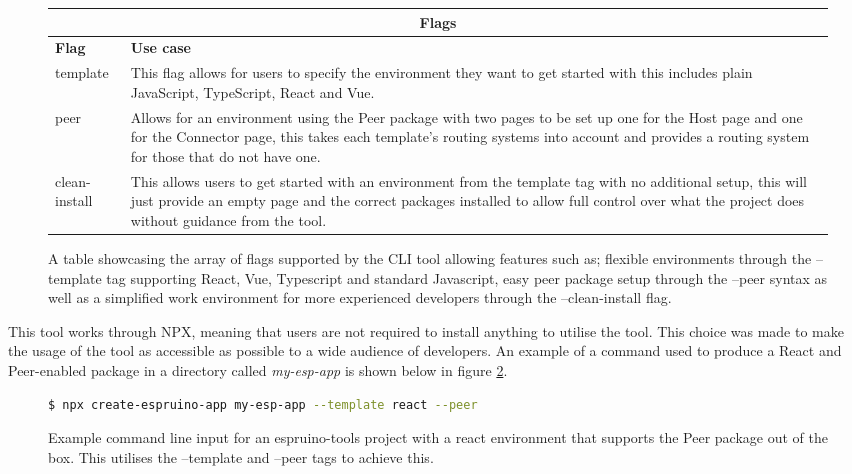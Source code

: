 \documentclass{l4proj}
\begin{document}
\begin{figure}[!ht]
    \centering
    \begin{tabular}{|p{2.25cm}|p{10cm}|}
 \hline
 \multicolumn{2}{|c|}{Flags} \\
 \hline
 \textbf{Flag}  & \textbf{Use case}\\
 \hline
 template & This flag allows for users to specify the environment they want to get started with this includes plain JavaScript, TypeScript, React and Vue.\\ \hline

 peer & Allows for an environment using the Peer package with two pages to be set up one for the Host page and one for the Connector page, this takes each template's routing systems into account and provides a routing system for those that do not have one.\\ \hline

 clean-install & This allows users to get started with an environment from the template tag with no additional setup, this will just provide an empty page and the correct packages installed to allow full control over what the project does without guidance from the tool.\\
 \hline
    \end{tabular}
    \caption{A table showcasing the array of flags supported by the CLI tool allowing features such as; flexible environments through the --template tag supporting React, Vue, Typescript and standard Javascript, easy peer package setup through the --peer syntax as well as a simplified work environment for more experienced developers through the --clean-install flag.}
    \label{fig:flag-comp}
\end{figure}

This tool works through NPX, meaning that users are not required to install anything to utilise the tool. This choice was made to make the usage of the tool as accessible as possible to a wide audience of developers. An example of a command used to produce a React and Peer-enabled package in a directory called \textit{my-esp-app} is shown below in figure \ref{fig:npx-command}.

\begin{figure}[!ht]
    \centering
    \begin{lstlisting}[language=bash]
        $ npx create-espruino-app my-esp-app --template react --peer
    \end{lstlisting}
    \caption{Example command line input for an espruino-tools project with a react environment that supports the Peer package out of the box. This utilises the --template and --peer tags to achieve this.}
    \label{fig:npx-command}
\end{figure}
\end{document}
